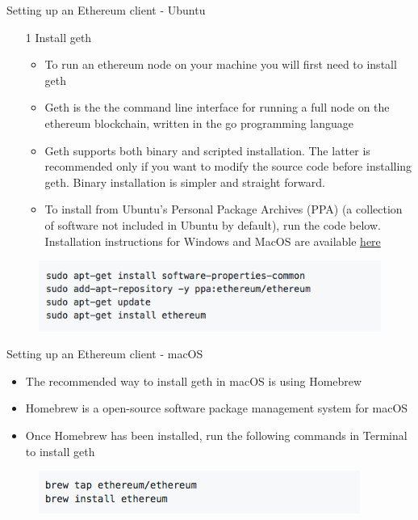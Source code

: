 \documentclass[9pt]{beamer}
\begin{document}

\begin{frame}{Setting up an Ethereum client - Ubuntu}
	\begin{enumerate}
		\item [1] Install geth
		\begin{itemize}
			\item To run an ethereum node on your machine you will first need to install geth
			\item Geth is the the command line interface for running a full node on the ethereum blockchain, written in the go programming language
			\item Geth supports both binary and scripted installation. The latter is recommended only if you want to modify the source code before installing geth. Binary installation is simpler and straight forward.
			\item To install from Ubuntu's Personal Package Archives (PPA) (a collection of software not included in Ubuntu by default), run the code below. Installation instructions for Windows and MacOS are available \href{https://github.com/qobolwakhe/MSc2018/wiki/Installing-Geth}{here}
		\end{itemize}
	\end{enumerate}
	\begin{figure}[]
		\centering
		\includegraphics  [scale=0.5]{Images/geth1}
	\end{figure}
\end{frame}


\begin{frame}{Setting up an Ethereum client - macOS}
	\begin{itemize}
		\item The recommended way to install geth in macOS is using Homebrew
		\item Homebrew is a open-source software package management system for macOS
		\item Once Homebrew has been installed, run the following commands in Terminal to install geth
	\end{itemize}
	\begin{figure}[]
		\centering
		\includegraphics  [scale=0.5]{Images/geth3}
	\end{figure}
\end{frame}
\end{document}
